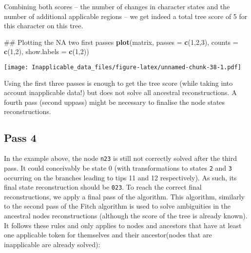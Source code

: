 \documentclass[]{book}
\newenvironment{Shaded}{\begin{snugshade}}{\end{snugshade}}
\newcommand{\KeywordTok}[1]{\textcolor[rgb]{0.13,0.29,0.53}{\textbf{#1}}}
\newcommand{\DataTypeTok}[1]{\textcolor[rgb]{0.13,0.29,0.53}{#1}}
\newcommand{\DecValTok}[1]{\textcolor[rgb]{0.00,0.00,0.81}{#1}}
\newcommand{\NormalTok}[1]{#1}
\theoremstyle{definition}
\theoremstyle{definition}
\theoremstyle{definition}
\theoremstyle{remark}
\begin{document}
Combining both scores -- the number of changes in character states and
the number of additional applicable regions -- we get indeed a total
tree score of 5 for this character on this tree.

\begin{Shaded}
\begin{Highlighting}[]
\NormalTok{## Plotting the NA two first passes}
\KeywordTok{plot}\NormalTok{(matrix, }\DataTypeTok{passes =} \KeywordTok{c}\NormalTok{(}\DecValTok{1}\NormalTok{,}\DecValTok{2}\NormalTok{,}\DecValTok{3}\NormalTok{), }\DataTypeTok{counts =} \KeywordTok{c}\NormalTok{(}\DecValTok{1}\NormalTok{,}\DecValTok{2}\NormalTok{), }\DataTypeTok{show.labels =} \KeywordTok{c}\NormalTok{(}\DecValTok{1}\NormalTok{,}\DecValTok{2}\NormalTok{))}
\end{Highlighting}
\end{Shaded}

\texttt{[image: Inapplicable\_data\_files/figure-latex/unnamed-chunk-38-1.pdf]}

Using the first three passes is enough to get the tree score (while
taking into account inapplicable data!) but does not solve all ancestral
reconstructions. A fourth pass (second uppass) might be necessary to
finalise the node states reconstructions.

\subsection{Pass 4}\label{pass-4}

In the example above, the node \texttt{n23} is still not correctly
solved after the third pass. It could conceivably be state 0 (with
transformations to states \texttt{2} and \texttt{3} occurring on the
branches leading to tips 11 and 12 respectively). As such, its final
state reconstruction should be \texttt{023}. To reach the correct final
reconstructions, we apply a final pass of the algorithm. This algorithm,
similarly to the second pass of the Fitch algorithm is used to solve
ambiguities in the ancestral nodes reconstructions (although the score
of the tree is already known). It follows these rules and only applies
to nodes and ancestors that have at least one applicable token for
themselves and their ancestor(nodes that are inapplicable are already
solved):
\end{document}
